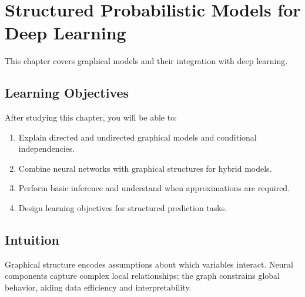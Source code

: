 
\chapter{Structured Probabilistic Models for Deep Learning}
\label{chap:structured-probabilistic-models}

This chapter covers graphical models and their integration with deep learning.


\section*{Learning Objectives}

After studying this chapter, you will be able to:

\begin{enumerate}
    \item Explain directed and undirected graphical models and conditional independencies.
    \item Combine neural networks with graphical structures for hybrid models.
    \item Perform basic inference and understand when approximations are required.
    \item Design learning objectives for structured prediction tasks.
\end{enumerate}



\section*{Intuition}

Graphical structure encodes assumptions about which variables interact. Neural components capture complex local relationships; the graph constrains global behavior, aiding data efficiency and interpretability.










